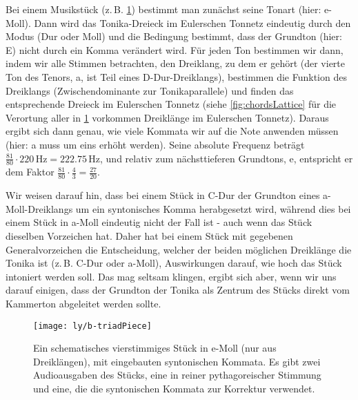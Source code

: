 \documentclass[ngerman,11pt]{scrartcl}
\begin{document}
Bei einem Musikstück (z.\,B. \cref{fig:triadPiece}) bestimmt man zunächst seine
Tonart (hier: e-Moll). Dann wird das Tonika-Dreieck im Eulerschen Tonnetz
eindeutig durch den Modus (Dur oder Moll) und die Bedingung bestimmt, dass der
Grundton (hier: E) nicht durch ein Komma verändert wird. Für jeden Ton bestimmen
wir dann, indem wir alle Stimmen betrachten, den Dreiklang, zu dem er gehört
(der vierte Ton des Tenors, a, ist Teil eines D-Dur-Dreiklangs), bestimmen die
Funktion des Dreiklangs (Zwischendominante zur Tonikaparallele) und finden das
entsprechende Dreieck im Eulerschen Tonnetz (siehe \cref{fig:chordsLattice} für
die Verortung aller in \cref{fig:triadPiece} vorkommen Dreiklänge im Eulerschen
Tonnetz). Daraus ergibt sich dann genau, wie viele Kommata wir auf die Note
anwenden müssen (hier: a muss um eins erhöht werden). Seine absolute Frequenz
beträgt $\frac{81}{80}\cdot 220\,\text{Hz}=222.75\,\text{Hz}$, und relativ zum
nächsttieferen Grundtons, e, entspricht er dem Faktor
$\frac{81}{80}\cdot\frac{4}{3}=\frac{27}{20}$.

Wir weisen darauf hin, dass bei einem Stück in C-Dur der Grundton eines
a-Moll-Dreiklangs um ein syntonisches Komma herabgesetzt wird, während dies bei
einem Stück in a-Moll eindeutig nicht der Fall ist - auch wenn das Stück
dieselben Vorzeichen hat. Daher hat bei einem Stück mit gegebenen
Generalvorzeichen die Entscheidung, welcher der beiden möglichen Dreiklänge die
Tonika ist (z.\,B. C-Dur oder a-Moll), Auswirkungen darauf, wie hoch das Stück
intoniert werden soll. Das mag seltsam klingen, ergibt sich aber, wenn wir uns
darauf einigen, dass der Grundton der Tonika als Zentrum des Stücks direkt vom
Kammerton abgeleitet werden sollte.

\begin{figure}
  \centering
  \texttt{[image: ly/b-triadPiece]}
  \caption{Ein schematisches vierstimmiges Stück in e-Moll (nur aus
  	Dreiklängen), mit eingebauten syntonischen Kommata. Es gibt zwei
  	Audioausgaben des Stücks, eine in reiner pythagoreischer Stimmung und eine,
  	die die syntonischen Kommata zur Korrektur
  	verwendet.}\label{fig:triadPiece}
\end{figure}
\end{document}
